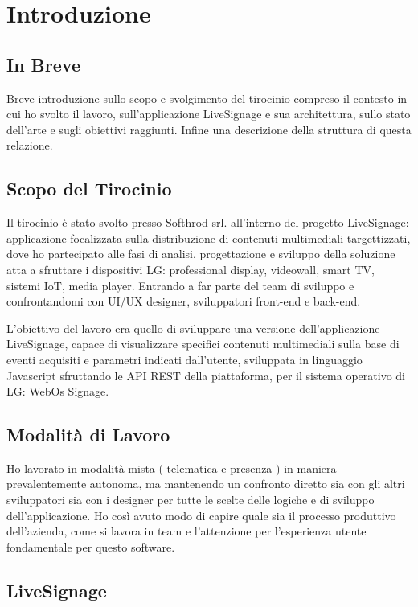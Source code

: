 \chapter{Introduzione}
\linespread{1.5}

\section{In Breve}
Breve introduzione sullo scopo e svolgimento del tirocinio compreso il contesto in cui ho svolto il lavoro, sull'applicazione LiveSignage e sua architettura, sullo stato dell'arte e sugli obiettivi raggiunti. Infine una descrizione della struttura di questa relazione.

\section{Scopo del Tirocinio}

Il tirocinio è stato svolto presso Softhrod srl. all'interno del progetto LiveSignage: applicazione focalizzata sulla distribuzione di contenuti multimediali targettizzati, dove ho partecipato alle fasi di analisi, progettazione e sviluppo della soluzione atta a sfruttare i dispositivi LG: professional display, videowall, smart TV, sistemi IoT, media player. Entrando a far parte del team di sviluppo e confrontandomi con UI/UX designer, sviluppatori front-end e back-end.

L'obiettivo del lavoro era quello di sviluppare una versione dell'applicazione LiveSignage, capace di visualizzare specifici contenuti multimediali sulla base di eventi acquisiti e parametri indicati dall'utente, sviluppata in linguaggio Javascript sfruttando le API REST della piattaforma, per il sistema operativo di LG: WebOs Signage.

\section{Modalità di Lavoro}

Ho lavorato in modalità mista ( telematica e presenza ) in maniera prevalentemente autonoma, ma mantenendo un confronto diretto sia con gli altri sviluppatori sia con i designer per tutte le scelte delle logiche e di sviluppo dell'applicazione. Ho così avuto modo di capire quale sia il processo produttivo dell'azienda, come si lavora in team e l'attenzione per l'esperienza utente fondamentale per questo software.

\section{LiveSignage}

